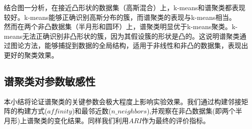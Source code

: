 \documentclass[11pt]{scrartcl}
\begin{document}
结合图一分析，在接近凸形状的数据集（高斯混合）上，k-means和谱聚类都表现较好。k-means能够正确识别高斯分布的簇，而谱聚类的表现与k-means相当。\\
然而在两个非凸数据集（半月形和圆环）上，谱聚类明显优于k-means聚类。k-means无法正确识别非凸形状的簇，因为其假设簇的形状是凸的。这说明谱聚类通过图论方法，能够捕捉到数据的全局结构，适用于非线性和非凸的数据集，表现出更好的聚类效果。


\subsection{谱聚类对参数敏感性}
本小结将论证谱聚类的关键参数会极大程度上影响实验效果。我们通过构建邻接矩阵的构建方式($affinity$)和最邻近数($n\_neighbors$),并观察在非凸数据集(即两个半月形)上谱聚类的变化结果。同样我们利用$ARI$作为最终的评价指标。
\end{document}
